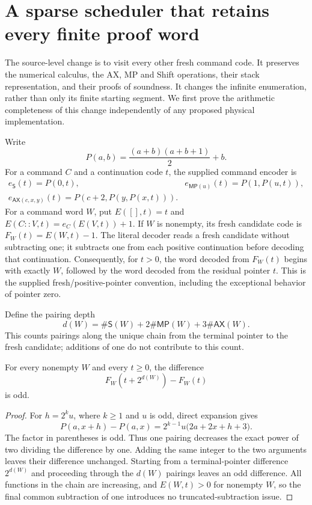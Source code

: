\section{A sparse scheduler that retains every finite proof word}
\label{sec:sparse-scheduler}

The source-level change is to visit every other fresh command code.
It preserves the numerical calculus, the AX, MP and Shift operations,
their stack representation, and their proofs of soundness. It changes the
infinite enumeration, rather than only its finite starting segment.
We first prove the arithmetic completeness of this change independently
of any proposed physical implementation.

Write
\[
 P(a,b)=\frac{(a+b)(a+b+1)}2+b.
\]
For a command $C$ and a continuation code $t$, the supplied command encoder is
\[
 \begin{array}{ll}
 e_{\mathsf S}(t)=P(0,t),&
 e_{\mathsf{MP}(u)}(t)=P(1,P(u,t)),\\[2pt]
 e_{\mathsf{AX}(c,x,y)}(t)=P(c+2,P(y,P(x,t))).
 \end{array}
\]
For a command word $W$, put $E([],t)=t$ and
$E(C::V,t)=e_C(E(V,t))+1$. If $W$ is nonempty, its fresh candidate code is
$F_W(t)=E(W,t)-1$. The literal decoder reads a fresh candidate without
subtracting one; it subtracts one from each positive continuation before
decoding that continuation. Consequently, for $t>0$, the word decoded from
$F_W(t)$ begins with exactly $W$, followed by the word decoded from the
residual pointer $t$. This is the supplied fresh/positive-pointer convention,
including the exceptional behavior of pointer zero.

Define the pairing depth
\[
 d(W)=\#\mathsf S(W)+2\#\mathsf{MP}(W)+3\#\mathsf{AX}(W).
\]
This counts pairings along the unique chain from the terminal pointer to
the fresh candidate; additions of one do not contribute to this count.

\begin{lemma}\label{lem:parity-padding}
For every nonempty $W$ and every $t\geq0$, the difference
\[
             F_W(t+2^{d(W)})-F_W(t)
\]
is odd.
\end{lemma}
\begin{proof}
For $h=2^ku$, where $k\geq1$ and $u$ is odd, direct expansion gives
\[
 P(a,x+h)-P(a,x)
   =2^{k-1}u\bigl(2a+2x+h+3\bigr).
\]
The factor in parentheses is odd. Thus one pairing decreases the exact
power of two dividing the difference by one. Adding the same integer to
the two arguments leaves their difference unchanged. Starting from a
terminal-pointer difference $2^{d(W)}$ and proceeding through the
$d(W)$ pairings leaves an odd difference. All functions in the chain
are increasing, and $E(W,t)>0$ for nonempty $W$, so the final common
subtraction of one introduces no truncated-subtraction issue.
\end{proof}

